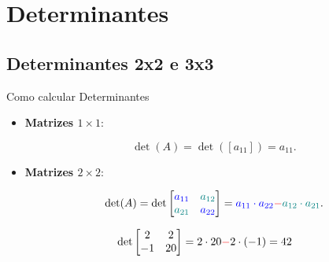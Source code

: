 \section{Determinantes}

\subsection*{Determinantes 2x2 e 3x3}
\begin{frame}[label=determinantes]{Como calcular Determinantes}

\begin{itemize}
\item {\color{blue} \textbf{Matrizes $1\times 1$}:}

\[\det(A)=\det([a_{11}])=a_{11}.\]

\item {\color{blue} \textbf{Matrizes $2\times 2$}:}

\[\det(A)=\det \begin{bmatrix}
{\color{blue}a_{11}} &{\color{teal} a_{12}}\\ {\color{teal}a_{21}} & {\color{blue}a_{22}}
\end{bmatrix}={\color{blue}a_{11}\cdot a_{22}}{\color{red}-}{\color{teal}a_{12}\cdot a_{21}}.  \] 
\end{itemize}

\begin{exe}
\[\det\begin{bmatrix}
2 & 2\\ -1 & 20 
\end{bmatrix}=2\cdot 20{\color{red}-}2\cdot (-1)=42\]
\end{exe}

\end{frame}


